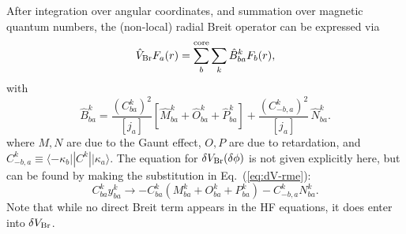 \documentclass[10pt,twocolumn,a4paper]{article}%
\newcommand{\bra}[1]{\ensuremath{\langle #1|}}	%
\newcommand{\ket}[1]{\ensuremath{|#1\rangle}}	%
\newcommand{\be}{\begin{equation}}
\newcommand{\ee}{\end{equation}}
\renewcommand{\k}{\ensuremath{\kappa}}
\begin{document}
After integration over angular coordinates, and summation over magnetic quantum numbers, the (non-local) radial Breit operator can be expressed via
\be\label{eq:HF_Breit}
\hat V_{\rm Br} F_a(r) = \sum_b^{\rm core}\sum_k \hat B^k_{ba}F_b(r),
\ee
with
\begin{equation}
\hat B^k_{ba} =   \frac{(C^k_{ba})^2 }{[j_a]}  \left[\hat M^k_{ba} + \hat O^k_{ba} + \hat P^k_{ba}\right]
 +
 \frac{(C^k_{-b,a})^2}{[j_a]} \, \hat N^k_{ba}.
\end{equation}
where
$M,N$ are due to the Gaunt effect, $O,P$ are due to retardation, and
 $C^k_{-b,a} \equiv \bra{-\k_b}|C^k|\ket{\k_a}$. %
The equation for $\delta V_{\rm Br}(\delta\phi)$ is not given explicitly here, 
but can be found by making the substitution in Eq.~(\ref{eq:dV-rme}):
\[
C^k_{ba}y^k_{ba}\to -C^k_{ba}(M_{ba}^k+O_{ba}^k+P_{ba}^k)  -C^k_{-b,a}N_{ba}^k.
\]
Note that while no direct Breit term appears in the HF equations, it does enter into $\delta V_{\rm Br}$.
\end{document}
